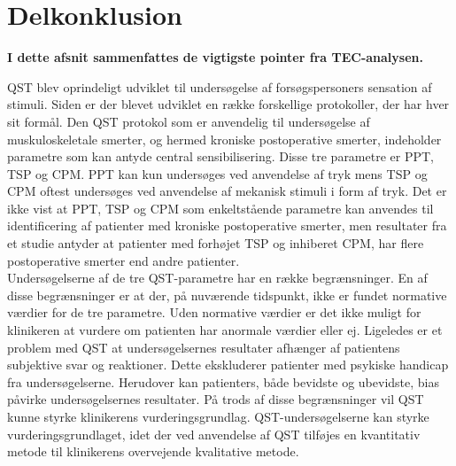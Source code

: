 \section{Delkonklusion}
\textbf{I dette afsnit sammenfattes de vigtigste pointer fra TEC-analysen.}

QST blev oprindeligt udviklet til undersøgelse af forsøgspersoners sensation af stimuli. Siden er der blevet udviklet en række forskellige protokoller, der har hver sit formål. Den QST protokol som er anvendelig til undersøgelse af muskuloskeletale smerter, og hermed kroniske postoperative smerter, indeholder parametre som kan antyde central sensibilisering. Disse tre parametre er PPT, TSP og CPM. PPT kan kun undersøges ved anvendelse af tryk mens TSP og CPM oftest undersøges ved anvendelse af mekanisk stimuli i form af tryk. Det er ikke vist at PPT, TSP og CPM som enkeltstående parametre kan anvendes til identificering af patienter med kroniske postoperative smerter, men resultater fra et studie antyder at patienter med forhøjet TSP og inhiberet CPM, har flere postoperative smerter end andre patienter.  \\
Undersøgelserne af de tre QST-parametre har en række begrænsninger. En af disse begrænsninger er at der, på nuværende tidspunkt, ikke er fundet normative værdier for de tre parametre. Uden normative værdier er det ikke muligt for klinikeren at vurdere om patienten har anormale værdier eller ej. Ligeledes er et problem med QST at undersøgelsernes resultater afhænger af patientens subjektive svar og reaktioner. Dette ekskluderer patienter med psykiske handicap fra undersøgelserne. Herudover kan patienters, både bevidste og ubevidste, bias påvirke undersøgelsernes resultater. På trods af disse begrænsninger vil QST kunne styrke klinikerens vurderingsgrundlag. QST-undersøgelserne kan styrke vurderingsgrundlaget, idet der ved anvendelse af QST  tilføjes en kvantitativ metode til klinikerens overvejende kvalitative metode.

